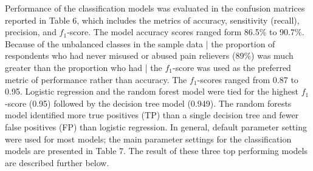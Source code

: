 \documentclass[sigconf]{acmart}
\begin{document}
Performance of the classification models was evaluated in the confusion 
matrices reported in Table 6, which includes the metrics of accuracy, 
sensitivity (recall), precision, and $f_1$-score. The model accuracy 
scores ranged form 86.5\% to 90.7\%. Because of the unbalanced classes in 
the sample data | the proportion of respondents who had never misused or 
abused pain relievers (89\%) was much greater than the proportion who had | 
the $f_1$-score was used as the preferred metric of performance rather 
than accuracy. The $f_1$-scores ranged from 0.87 to 0.95. Logistic 
regression and the random forest model were tied for the highest 
$f_1$-score (0.95) followed by the decision tree model (0.949). The 
random forests model identified more true positives (TP) than a single 
decision tree and fewer false positives (FP) than logistic regression. 
In general, default parameter setting were used for most models; the main 
parameter settings for the classification models are presented in Table 7.
The result of these three top performing models are described further below.  
 
\end{document}
